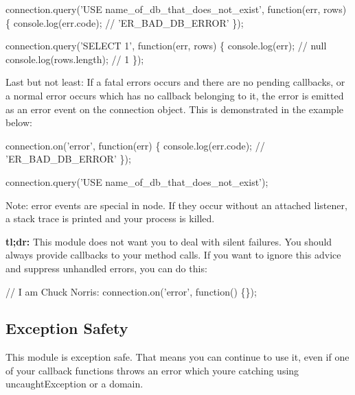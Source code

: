\begin{DoxyCode}
connection.query(\textcolor{stringliteral}{'USE name\_of\_db\_that\_does\_not\_exist'}, \textcolor{keyword}{function}(err, rows) \{
  console.log(err.code); \textcolor{comment}{// 'ER\_BAD\_DB\_ERROR'}
\});

connection.query(\textcolor{stringliteral}{'SELECT 1'}, \textcolor{keyword}{function}(err, rows) \{
  console.log(err); \textcolor{comment}{// null}
  console.log(rows.length); \textcolor{comment}{// 1}
\});
\end{DoxyCode}


Last but not least\+: If a fatal errors occurs and there are no pending callbacks, or a normal error occurs which has no callback belonging to it, the error is emitted as an {\ttfamily \textquotesingle{}error\textquotesingle{}} event on the connection object. This is demonstrated in the example below\+:


\begin{DoxyCode}
connection.on(\textcolor{stringliteral}{'error'}, \textcolor{keyword}{function}(err) \{
  console.log(err.code); \textcolor{comment}{// 'ER\_BAD\_DB\_ERROR'}
\});

connection.query(\textcolor{stringliteral}{'USE name\_of\_db\_that\_does\_not\_exist'});
\end{DoxyCode}


Note\+: {\ttfamily \textquotesingle{}error\textquotesingle{}} events are special in node. If they occur without an attached listener, a stack trace is printed and your process is killed.

{\bfseries tl;dr\+:} This module does not want you to deal with silent failures. You should always provide callbacks to your method calls. If you want to ignore this advice and suppress unhandled errors, you can do this\+:


\begin{DoxyCode}
\textcolor{comment}{// I am Chuck Norris:}
connection.on(\textcolor{stringliteral}{'error'}, \textcolor{keyword}{function}() \{\});
\end{DoxyCode}


\subsection*{Exception Safety}

This module is exception safe. That means you can continue to use it, even if one of your callback functions throws an error which you\textquotesingle{}re catching using \textquotesingle{}uncaught\+Exception\textquotesingle{} or a domain.

